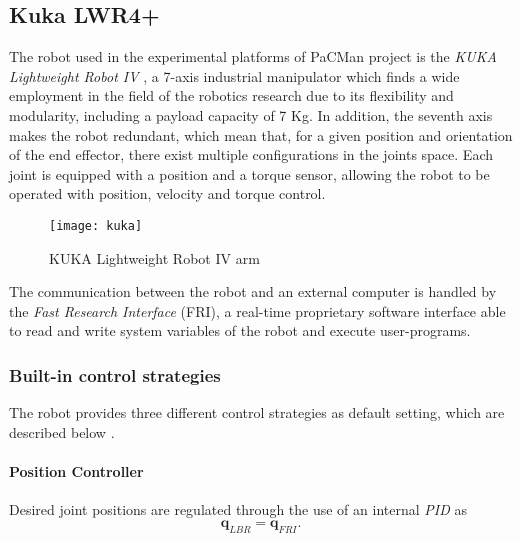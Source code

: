 \subsection{Kuka LWR4+}
\label{sec:kuka}

The robot used in the experimental platforms of PaCMan project is the \textit{KUKA Lightweight Robot IV} \cite{webkuka},  a 7-axis industrial manipulator which finds a wide employment in the field of the robotics research due to its flexibility and modularity, including a payload capacity of 7 Kg. In addition, the seventh axis makes the robot redundant, which mean that, for a given position and orientation of the end effector, there exist multiple configurations in the joints space. Each joint is equipped with a position and a torque sensor, allowing the robot to be operated with position, velocity and torque control. 

\begin{figure}[h]
\centering
\texttt{[image: kuka]}
\caption{KUKA Lightweight Robot IV arm}
\end{figure}

The communication between the robot and an external computer is handled by the \textit{Fast Research Interface} (FRI), a real-time proprietary software interface able to read and write system variables of the robot and execute user-programs.

\subsubsection{Built-in control strategies}
The robot provides three different control strategies as default setting, which are described below \cite{kukafri}.

\paragraph{Position Controller}
Desired joint positions are regulated through the use of an internal \textit{PID} as
\begin{equation}
\mathbf{q}_{LBR} = \mathbf{q}_{FRI}.
\label{eq:positioncontroller}
\end{equation}

